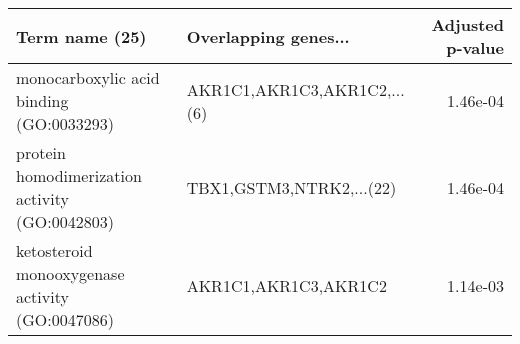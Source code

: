 \begin{tabular}{llr}
\toprule
                                 Term name (25) &        Overlapping genes... &  Adjusted p-value \\
\midrule
       monocarboxylic acid binding (GO:0033293) & AKR1C1,AKR1C3,AKR1C2,...(6) &          1.46e-04 \\
 protein homodimerization activity (GO:0042803) &    TBX1,GSTM3,NTRK2,...(22) &          1.46e-04 \\
ketosteroid monooxygenase activity (GO:0047086) &        AKR1C1,AKR1C3,AKR1C2 &          1.14e-03 \\
\bottomrule
\end{tabular}
